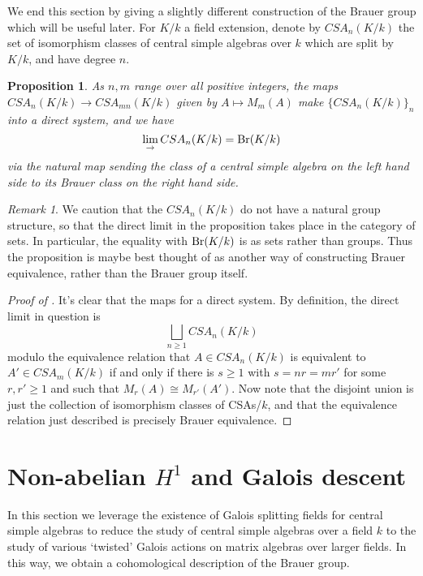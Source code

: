 \documentclass[11pt]{amsart}
\numberwithin{equation}{section}
\newtheorem{proposition}[equation]{Proposition}
\theoremstyle{remark}
\newtheorem{remark}[equation]{Remark}
\theoremstyle{remark}
\theoremstyle{remark}
\theoremstyle{definition}
\theoremstyle{definition}
\theoremstyle{definition}
\theoremstyle{definition}
\theoremstyle{definition}
\theoremstyle{definition}
\begin{document}
We end this section by giving a slightly different construction of the Brauer group which will be useful later. For $K/k$ a field extension, denote by $CSA_n(K/k)$ the set of isomorphism classes of central simple algebras over $k$ which are split by $K/k$, and have degree $n$.

\begin{proposition} \label{brauer as direct limit}
As $n,m$ range over all positive integers, the maps $CSA_n(K/k)\rightarrow CSA_{mn}(K/k)$ given by $A\mapsto M_m(A)$ make $\{CSA_n(K/k)\}_{n}$ into a direct system, and we have 
\[\lim_{\rightarrow}CSA_n(K/k)=\textup{Br}(K/k)\]
via the natural map sending the class of a central simple algebra on the left hand side to its Brauer class on the right hand side. 
\end{proposition}

\begin{remark} 
We caution that the $CSA_n(K/k)$ do not have a natural group structure, so that the direct limit in the proposition takes place in the category of sets. In particular, the equality with $\textup{Br}(K/k)$ is as sets rather than groups. Thus the proposition  is maybe best  thought of as another way of constructing Brauer equivalence, rather than the Brauer group itself. 
\end{remark}

\begin{proof}[Proof of ]
It's clear that the maps for a direct system. By definition, the direct limit in question is 
\[\bigsqcup_{n\geq 1}CSA_n(K/k)\]
modulo the equivalence relation that $A\in CSA_n(K/k)$ is equivalent to $A'\in CSA_m(K/k)$ if and only if there is $s\geq 1$ with $s=nr=mr'$ for some $r,r'\geq 1$ and such that $M_r(A)\cong M_{r'}(A')$. Now note that the disjoint union is just the collection of isomorphism classes of CSAs/$k$, and that the equivalence relation just described is precisely Brauer equivalence.
\end{proof}


\section{Non-abelian $H^1$ and Galois descent}

In this section we leverage the existence of Galois splitting fields for central simple algebras to reduce the study of central simple algebras over a field $k$ to the study of various `twisted' Galois actions on matrix algebras over larger fields. In this way, we obtain a cohomological description of the Brauer group. 
\end{document}
